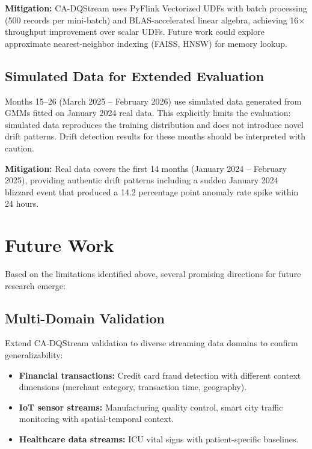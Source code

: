 \textbf{Mitigation:} CA-DQStream uses PyFlink Vectorized UDFs with batch processing (500 records per mini-batch) and BLAS-accelerated linear algebra, achieving 16$\times$ throughput improvement over scalar UDFs. Future work could explore approximate nearest-neighbor indexing (FAISS, HNSW) for memory lookup.

\subsection{Simulated Data for Extended Evaluation}

Months 15--26 (March 2025 -- February 2026) use simulated data generated from GMMs fitted on January 2024 real data. This explicitly limits the evaluation: simulated data reproduces the training distribution and does not introduce novel drift patterns. Drift detection results for these months should be interpreted with caution.

\textbf{Mitigation:} Real data covers the first 14 months (January 2024 -- February 2025), providing authentic drift patterns including a sudden January 2024 blizzard event that produced a 14.2 percentage point anomaly rate spike within 24 hours.

\section{Future Work}

Based on the limitations identified above, several promising directions for future research emerge:

\subsection{Multi-Domain Validation}

Extend CA-DQStream validation to diverse streaming data domains to confirm generalizability:
\begin{itemize}
    \item \textbf{Financial transactions:} Credit card fraud detection with different context dimensions (merchant category, transaction time, geography).
    \item \textbf{IoT sensor streams:} Manufacturing quality control, smart city traffic monitoring with spatial-temporal context.
    \item \textbf{Healthcare data streams:} ICU vital signs with patient-specific baselines.
\end{itemize}

